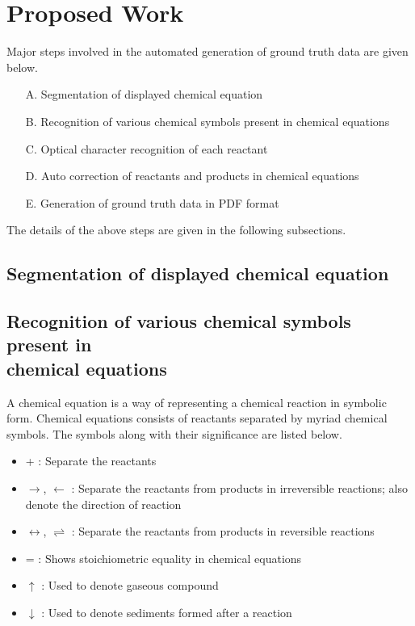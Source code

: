 \documentclass[conference]{IEEEtran}
\begin{document}

\section{Proposed Work}

Major steps involved in the automated generation of ground truth data are given below.

\begin{itemize}

\item[A.]
Segmentation of displayed chemical equation
\item[B.]
Recognition of various chemical symbols present in chemical equations 
\item[C.]
Optical character recognition of each reactant
\item[D.]
Auto correction of reactants and products in chemical equations
\item[E.]
Generation of ground truth data in PDF format

\end{itemize}

The details of the above steps are given in the following subsections.

\subsection{Segmentation of displayed chemical equation}
\subsection{Recognition of various chemical symbols present in \\chemical equations} 
A chemical equation is a way of representing a chemical reaction in symbolic form.
Chemical equations consists of reactants separated by myriad chemical symbols. The symbols along with their significance are listed below. 

\begin{itemize}
\item
+ : Separate the reactants
\item
$\rightarrow$, $\leftarrow$ : Separate the reactants from products in irreversible reactions; also denote the direction of reaction
\item
$\leftrightarrow$, $\rightleftharpoons$ : Separate the reactants from products in reversible reactions
\item 
= : Shows stoichiometric equality in chemical equations
\item
$\uparrow$ : Used to denote gaseous compound
\item
$\downarrow$ : Used to denote sediments formed after a reaction
\end{itemize} 
\end{document}

